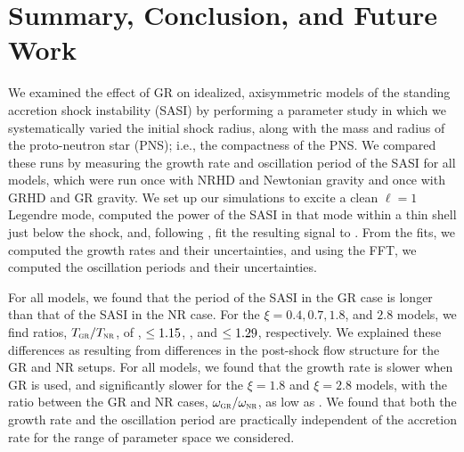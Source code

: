 \section{Summary, Conclusion, and Future Work}
\label{ss.scfw}

We examined the effect of GR on \nModels{}
idealized, axisymmetric models
of the standing accretion shock instability (SASI) by performing a
parameter study in  which we systematically varied the initial shock radius,
along with the mass and  radius of the proto-neutron star (PNS);
i.e., the compactness of the PNS.
We  compared these runs by measuring the growth rate and oscillation period of
the SASI for all models, which were run once with NRHD and Newtonian gravity
and once  with GRHD and GR gravity.
We set up our simulations to excite a clean $\ell=1$ Legendre mode,
computed the power of the  SASI in that mode within a thin shell just below
the shock, and, following \citet{bm2006}, fit the resulting signal to
.
From the fits, we computed the growth rates and their uncertainties,
and using the FFT,
we computed the oscillation periods and their uncertainties.

For all models, we found that the period of the SASI in the GR case is longer
than that of the SASI in the NR case.
For the $\xi=0.4,0.7,1.8$, and $2.8$ models,
we find ratios, $T_{\textsc{gr}}/T_{\textsc{nr}}$, of
\PeriodRatioGRoverNRxiA,
$\leq1.15$,
\PeriodRatioGRoverNRxiC,
and $\leq1.29$, respectively.
We explained these differences as resulting from differences in the post-shock
flow structure for the GR and NR setups.
For all models, we found that the
growth rate is slower when GR is used,
and significantly slower for the
$\xi=1.8$ and $\xi=2.8$ models,
with the ratio between the GR and NR cases, $\omega_{\textsc{gr}}/\omega_{\textsc{nr}}$, as low as
\GrowthRateRatioGRoverNRxiD.
We found that both the growth rate and the oscillation period are practically
independent of the accretion rate for the range of parameter space we
considered.

